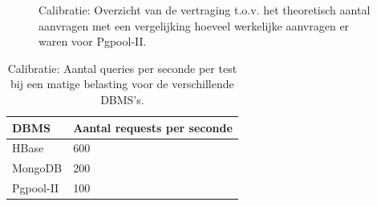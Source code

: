 \begin{figure}[htb!] 
	\centering
	\caption{Calibratie: Overzicht van de vertraging t.o.v. het theoretisch aantal aanvragen met een vergelijking hoeveel werkelijke aanvragen er waren voor Pgpool-II. }
	\label{fig:calibratie-queriesperseconde-pgpool-ii}
\end{figure}

\begin{table}[htb!]
	\centering
	\begin{tabular}{l| l }
		\textbf{DBMS} & Aantal requests per seconde \\
		\hline
		HBase & 600 \\
		MongoDB & 200\\
		Pgpool-II & 100\\
	\end{tabular}
	\caption{Calibratie: Aantal queries per seconde per test bij een matige belasting voor de verschillende DBMS's.}
	\label{table:calibratie-queriesperseconde-resultaat}
\end{table}



